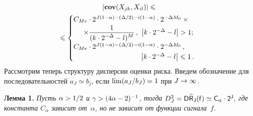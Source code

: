 \begin{multicols}{2}

\noindent
\begin{multline}
|\cov(X_{jk},X_{il})| \leqslant{}\\
\!\!{}\leqslant
    \begin{cases}
        C_{Me}\cdot2^{J(1-\alpha)-({\Delta}/{2})-i(1-\alpha)}\cdot2^{-\Delta M_0} \times{}\\
         \hspace*{5mm}\times \fr{1}{(k\cdot2^{-\Delta}-l)^M}\,, &  \hspace*{-30mm}
         \left\vert k\cdot2^{-\Delta}-l\right\vert > 1; \\
        C_{Me}\cdot2^{J(1-\alpha)-({\Delta}/{2})-i(1-\alpha)}\cdot2^{-\Delta M_0}\,, & \\
        \hspace*{34mm}\left\vert k\cdot2^{-\Delta}-l\right\vert \leqslant 1\,. &
    \end{cases}\!\!
    \label{Cov_Multi_Decay}
\end{multline}
Рассмотрим теперь структуру дисперсии оценки риска.
Введем обозначение для последовательностей
$a_J\simeq b_j$, если $\lim ({a_J}/{b_J}) \hm= 1$ при $J\hm\rightarrow \infty$.

\bigskip

\noindent
\textbf{Лемма 1.}
\textit{Пусть $\alpha\hm>1/2$ и $\gamma\hm>(4\alpha\hm-2)^{-1}$, тогда 
$D_J^2 \hm=\Variance \widehat{R}_J(f) \simeq  C_{\alpha}\cdot2^J,$ 
где константа $C_{\alpha}$ зависит от~$\alpha$, но не зависит от функции сигнала~$f$.}

\medskip


\end{multicols}
